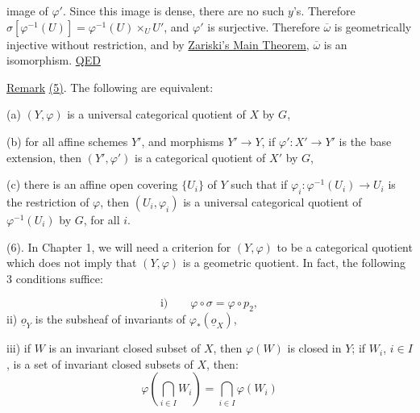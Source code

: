 image of $\varphi'$. Since this image is dense, there are no such $y$'s.
Therefore $\sigma[\varphi^{-1}(U)]=\varphi^{-1}(U)\times_U U'$, and $\varphi'$ is surjective.
Therefore $\overline\omega$ is geometrically injective without restriction, and by \uline{Zariski's Main Theorem}, $\overline\omega$ is an isomorphism. \uline{QED}
\margin{!}

\uline{Remark} \uline{(5)}. The following are equivalent:

(a) $(Y,\varphi)$ is a universal categorical quotient of $X$ by $G$,

(b) for all affine schemes $Y'$, and morphisms $Y'\longrightarrow Y$, if $\varphi':X'\to Y'$ is the base extension, then $(Y',\varphi')$ is a categorical quotient of $X'$ by $G$,

(c) there is an affine open covering $\{U_i\}$ of $Y$ such that if $\varphi_i:\varphi^{-1}(U_i)\longrightarrow U_i$ is the restriction of $\varphi$, then $(U_i,\varphi_i)$ is a universal categorical quotient of $\varphi^{-1}(U_i)$ by $G$, for all $i$.

(6). In Chapter 1, we will need a criterion for $(Y,\varphi)$ to be a categorical quotient which does not imply that $(Y,\varphi)$ is a geometric quotient. In fact, the following 3 conditions suffice:

\[
\text{i)}\qquad\varphi\circ\sigma=\varphi\circ p_2,
\]
ii) $\underline o_Y$ is the subsheaf of invariants of $\varphi_*(\underline o_X)$,

iii) if $W$ is an invariant closed subset of $X$, then $\varphi(W)$ is closed in $Y$; if $W_i$, $i\in I$, is a set of invariant closed subsets of $X$, then:
\[
\varphi\left(\bigcap_{i\in I}W_i\right)=\bigcap_{i\in I}\varphi(W_i)
\]
